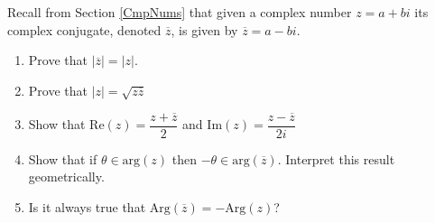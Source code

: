 { Recall from Section \ref{CmpNums} that given a complex number $z = a+bi$ its complex conjugate, denoted $\overline{z}$, is given by $\overline{z} = a - bi$.
\begin{enumerate} 
\item Prove that $\left| \overline{z} \right| = |z|$. 
\item Prove that $|z| = \sqrt{z \overline{z}}$ 
\item  Show that $\text{Re}(z) = \dfrac{z + \overline{z}}{2}$ and $\text{Im}(z) = \dfrac{z - \overline{z}}{2i}$ 
\item  Show that if $\theta \in \text{arg}(z)$ then $-\theta \in \text{arg}\left(\overline{z}\right)$. Interpret this result geometrically. 
\item  Is it always true that $\text{Arg}\left(\overline{z}\right) = -\text{Arg}(z)$?
\end{enumerate}}
{}
